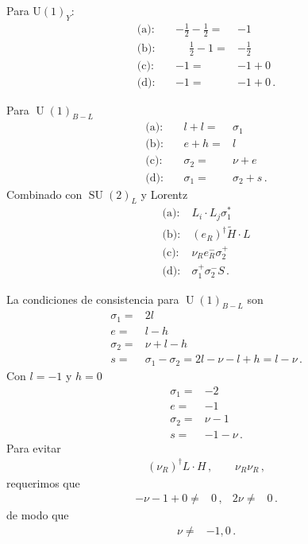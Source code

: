 \begin{frame}
Para $\operatorname{U(1)}_Y$:
\begin{align}
   \text{(a)}:&\  &-\frac{1}{2}-\frac{1}{2}=&-1 \nonumber\\
   \text{(b)}:&\ &\phantom{-} \frac{1}{2}-1=&-\frac{1}{2} \nonumber\\
  \text{(c)}:&\ &-1=&-1+0  \nonumber\\
  \text{(d)}:&\  & -1=&-1+0  \,.
\end{align}

Para $\operatorname{U}(1)_{B-L}$
\begin{align}
  \text{(a)}:&\  &l +l=&\sigma_1 \nonumber\\
  \text{(b)}:&\  &e+h=&l \nonumber\\
  \text{(c)}:&\  &\sigma_2=&\nu+e \nonumber\\
  \text{(d)}:&\ &\sigma_1=&\sigma_2+s\,.
\end{align}
Combinado con $\operatorname{SU}(2)_L$ y Lorentz
\begin{align}
  \text{(a)}:&\  L_i\cdot L_j \sigma_1^{*} \nonumber\\
  \text{(b)}:&\  \left( e_R \right)^{\dagger} \widetilde{H} \cdot L \nonumber\\
  \text{(c)}:&\  \nu_R e_R^- \sigma_2^+  \nonumber\\
  \text{(d)}:&\ \sigma_1^+\sigma_2^{-} S\,.
\end{align}

La condiciones de consistencia para $\operatorname{U}(1)_{B-L}$ son 
\begin{align}
    \sigma_1=&2l \nonumber\\
  e=&l-h \nonumber\\
  \sigma_2=&\nu+l-h \nonumber\\
  s=&\sigma_1-\sigma_2=2l-\nu-l+h=l-\nu\,.
\end{align}
Con $l=-1$ y $h=0$
\begin{align}
   \sigma_1=&-2 \nonumber\\
    e=&-1 \nonumber\\
\sigma_2=&\nu-1 \nonumber\\
   s=&-1-\nu\,.
\end{align}
Para evitar
\begin{align}
 \left( \nu_R \right)^{\dagger}  L\cdot H\,,\qquad \nu_R \nu_R\,,
\end{align}
requerimos que
\begin{align}
  -\nu -1 +0 \ne& 0\,, & 2 \nu\ne& 0\,.
\end{align}
de modo que
\begin{align}
  \nu\ne& -1,0\,.
\end{align}


\end{frame}
